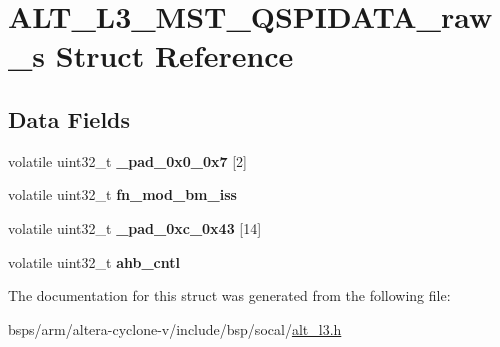 \hypertarget{structALT__L3__MST__QSPIDATA__raw__s}{}\section{A\+L\+T\+\_\+\+L3\+\_\+\+M\+S\+T\+\_\+\+Q\+S\+P\+I\+D\+A\+T\+A\+\_\+raw\+\_\+s Struct Reference}
\label{structALT__L3__MST__QSPIDATA__raw__s}
\subsection*{Data Fields}
\begin{DoxyCompactItemize}
\item 
\mbox{\label{structALT__L3__MST__QSPIDATA__raw__s_a5fed6a057dba9662c3556ebae9b589b6}} 
volatile uint32\+\_\+t {\bfseries \+\_\+pad\+\_\+0x0\+\_\+0x7} \mbox{[}2\mbox{]}
\item 
\mbox{\label{structALT__L3__MST__QSPIDATA__raw__s_a41583c689f2fb15f64a2663f9398334c}} 
volatile uint32\+\_\+t {\bfseries fn\+\_\+mod\+\_\+bm\+\_\+iss}
\item 
\mbox{\label{structALT__L3__MST__QSPIDATA__raw__s_a994cd28b18eaafbeadf1a25e264ecbfb}} 
volatile uint32\+\_\+t {\bfseries \+\_\+pad\+\_\+0xc\+\_\+0x43} \mbox{[}14\mbox{]}
\item 
\mbox{\label{structALT__L3__MST__QSPIDATA__raw__s_afb2fdfb2b6feebba7e94d65d4e1f532e}} 
volatile uint32\+\_\+t {\bfseries ahb\+\_\+cntl}
\end{DoxyCompactItemize}


The documentation for this struct was generated from the following file\+:\begin{DoxyCompactItemize}
\item 
bsps/arm/altera-\/cyclone-\/v/include/bsp/socal/\mbox{\hyperlink{alt__l3_8h}{alt\+\_\+l3.\+h}}\end{DoxyCompactItemize}
